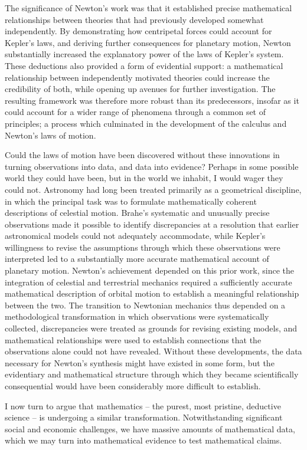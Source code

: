\documentclass{article}
\begin{document}
The significance of Newton's work was that it established precise mathematical relationships between theories that had 
previously developed somewhat independently. By demonstrating how centripetal forces could account for Kepler's laws, 
and deriving further consequences for planetary motion, Newton substantially increased the explanatory power of the laws of  
Kepler's system. These deductions also provided a form of evidential support: a mathematical relationship between 
independently motivated theories could increase the credibility of both, while opening up avenues for further investigation. 
The resulting framework was therefore more robust than its predecessors, insofar as it could account for a wider range of 
phenomena through a common set of principles; a process which culminated in the development of the calculus and Newton's 
laws of motion.

Could the laws of motion have been discovered without these innovations in turning observations into data, and data into 
evidence? Perhaps in some possible world they could have been, but in the world we inhabit, I would wager they could not. 
Astronomy had long been treated primarily as a geometrical discipline, in which the principal task was to formulate 
mathematically coherent descriptions of celestial motion. Brahe's systematic and unusually precise observations made it 
possible to identify discrepancies at a resolution that earlier astronomical models could not adequately accommodate, 
while Kepler's willingness to revise the assumptions through which these observations were interpreted led to a 
substantially more accurate mathematical account of planetary motion. Newton's achievement depended on this prior work, 
since the integration of celestial and terrestrial mechanics required a sufficiently accurate mathematical description 
of orbital motion to establish a meaningful relationship between the two. The transition to Newtonian mechanics thus 
depended on a methodological transformation in which observations were systematically collected, discrepancies were 
treated as grounds for revising existing models, and mathematical relationships were used to establish connections that the 
observations alone could not have revealed. Without these developments, the data necessary for Newton's synthesis might 
have existed in some form, but the evidentiary and mathematical structure through which they became scientifically 
consequential would have been considerably more difficult to establish.

I now turn to argue that mathematics -- the purest, most pristine, deductive science -- is undergoing a similar transformation.
Notwithstanding significant social and economic challenges, we have massive amounts of mathematical data,
which we may turn into mathematical evidence to test mathematical claims.
\end{document}
